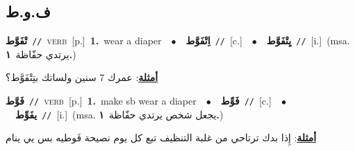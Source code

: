 \documentclass[10pt,a4paper,twoside]{article} %
\begin{document}
\begin{multicols}{2}
\vspace{-3mm}
\subsection*{\color{blue}\foreignlanguage{arabic}{ف.و.ط}\color{blue}{}} 

{\setlength\topsep{0pt}\textbf{\foreignlanguage{arabic}{تْفَوَّط}}\ {\color{gray}\texttt{//}\color{black}}\ \textsc{verb}\ [p.]\ \textbf{1.}~wear a diaper\ \ $\bullet$\ \ \setlength\topsep{0pt}\textbf{\foreignlanguage{arabic}{اِتْفَوَّط}}\ {\color{gray}\texttt{//}\color{black}}\ [c.]\ \ $\bullet$\ \ \setlength\topsep{0pt}\textbf{\foreignlanguage{arabic}{يِتْفَوَّط}}\ {\color{gray}\texttt{//}\color{black}}\ [i.]\ \color{gray}(msa. \foreignlanguage{arabic}{يرتدي حفّاظة}~\foreignlanguage{arabic}{\textbf{١.}})\color{black}\  \begin{flushright}\color{gray}\foreignlanguage{arabic}{\textbf{\underline{\foreignlanguage{arabic}{أمثلة}}}: عمرك 7 سنين ولساتك بتِتْفَوَّط؟}\end{flushright}\color{black}} \vspace{2mm}

{\setlength\topsep{0pt}\textbf{\foreignlanguage{arabic}{فَوَّط}}\ {\color{gray}\texttt{//}\color{black}}\ \textsc{verb}\ [p.]\ \textbf{1.}~make sb wear a diaper\ \ $\bullet$\ \ \setlength\topsep{0pt}\textbf{\foreignlanguage{arabic}{فَوِّط}}\ {\color{gray}\texttt{//}\color{black}}\ [c.]\ \ $\bullet$\ \ \setlength\topsep{0pt}\textbf{\foreignlanguage{arabic}{يفَوِّط}}\ {\color{gray}\texttt{//}\color{black}}\ [i.]\ \color{gray}(msa. \foreignlanguage{arabic}{يجعل شخص يرتدي حفّاظة}~\foreignlanguage{arabic}{\textbf{١.}})\color{black}\  \begin{flushright}\color{gray}\foreignlanguage{arabic}{\textbf{\underline{\foreignlanguage{arabic}{أمثلة}}}: إِذا بدك ترتاحي من غلبة التنظيف تبع كل يوم نصيحة فَوطيه بس يي ينام}\end{flushright}\color{black}} \vspace{2mm}


\end{multicols}
\end{document}
